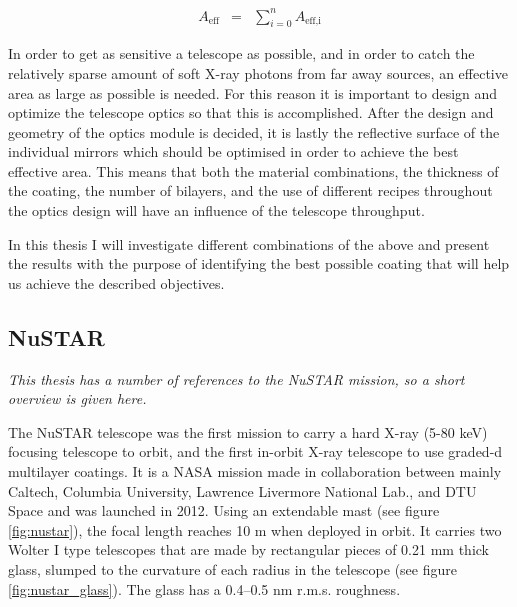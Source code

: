 \begin{eqnarray}
A_{\text{eff}} &=& \sum_{i=0}^n A_{\text{eff,i}}
\end{eqnarray}

In order to get as sensitive a telescope as possible, and in order to catch the relatively sparse amount of soft X-ray photons from far away sources, an effective area as large as possible is needed. For this reason it is important to design and optimize the telescope optics so that this is accomplished. After the design and geometry of the optics module is decided, it is lastly the reflective surface of the individual mirrors which should be optimised in order to achieve the best effective area. This means that both the material combinations, the thickness of the coating, the number of bilayers, and the use of different recipes throughout the optics design will have an influence of the telescope throughput.

In this thesis I will investigate different combinations of the above and present the results with the purpose of identifying the best possible coating that will help us achieve the described objectives.

\subsection{NuSTAR}\label{sec:nustar}
\emph{This thesis has a number of references to the NuSTAR mission, so a short overview is given here.}

The NuSTAR telescope was the first mission to carry a hard X-ray (5-80 keV) focusing telescope to orbit, and the first in-orbit X-ray telescope to use graded-d multilayer coatings. It is a NASA mission made in collaboration between mainly Caltech, Columbia University, Lawrence Livermore National Lab., and DTU Space and was launched in 2012. Using an extendable mast (see figure \ref{fig:nustar}), the focal length reaches 10 m when deployed in orbit. It carries two Wolter I type telescopes that are made by rectangular pieces of 0.21 mm thick glass, slumped to the curvature of each radius in the telescope\cite{Craig:2000fd,Hailey:1997ie} (see figure \ref{fig:nustar_glass}). The glass has a 0.4--0.5 nm r.m.s. roughness.


